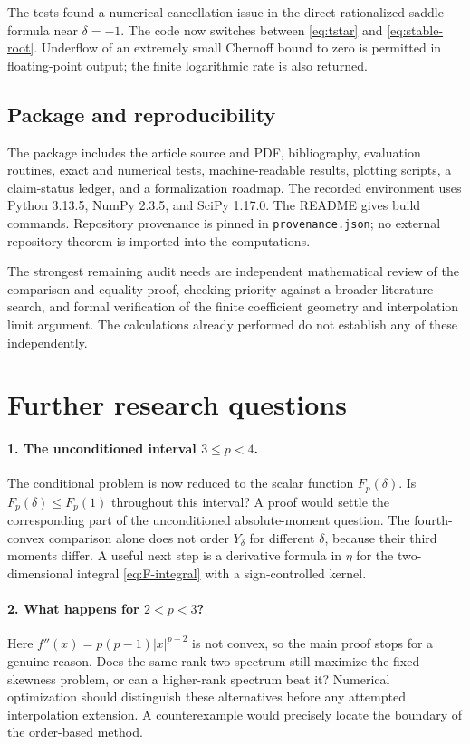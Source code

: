 \documentclass[11pt]{article}
\numberwithin{equation}{section}
\theoremstyle{definition}
\theoremstyle{remark}
\begin{document}
The tests found a numerical cancellation issue in the direct rationalized saddle formula near $\delta=-1$. The code now switches between \eqref{eq:tstar} and \eqref{eq:stable-root}. Underflow of an extremely small Chernoff bound to zero is permitted in floating-point output; the finite logarithmic rate is also returned.

\subsection{Package and reproducibility}
The package includes the article source and PDF, bibliography, evaluation routines, exact and numerical tests, machine-readable results, plotting scripts, a claim-status ledger, and a formalization roadmap. The recorded environment uses Python 3.13.5, NumPy 2.3.5, and SciPy 1.17.0. The README gives build commands. Repository provenance is pinned in \texttt{provenance.json}; no external repository theorem is imported into the computations.

The strongest remaining audit needs are independent mathematical review of the comparison and equality proof, checking priority against a broader literature search, and formal verification of the finite coefficient geometry and interpolation limit argument. The calculations already performed do not establish any of these independently.

\section{Further research questions}
\label{sec:future}

\paragraph{1. The unconditioned interval $3\leq p<4$.}
The conditional problem is now reduced to the scalar function $F_p(\delta)$. Is
$F_p(\delta)\leq F_p(1)$ throughout this interval? A proof would settle the corresponding part of the unconditioned absolute-moment question. The fourth-convex comparison alone does not order $Y_\delta$ for different $\delta$, because their third moments differ. A useful next step is a derivative formula in $\eta$ for the two-dimensional integral \eqref{eq:F-integral} with a sign-controlled kernel.

\paragraph{2. What happens for $2<p<3$?}
Here $f''(x)=p(p-1)|x|^{p-2}$ is not convex, so the main proof stops for a genuine reason. Does the same rank-two spectrum still maximize the fixed-skewness problem, or can a higher-rank spectrum beat it? Numerical optimization should distinguish these alternatives before any attempted interpolation extension. A counterexample would precisely locate the boundary of the order-based method.
\end{document}
